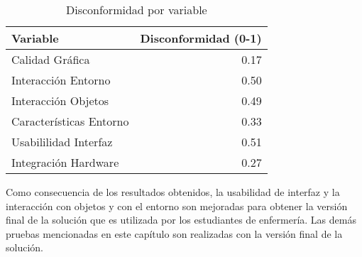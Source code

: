 
\begin{table}[H]
\centering
\begin{tabular}{lr}
\toprule
Variable & Disconformidad (0-1)\\
\midrule
Calidad Gráfica         & 0.17 \\
Interacción Entorno     & 0.50\\
Interacción Objetos     & 0.49\\
Características Entorno & 0.33\\
Usabililidad Interfaz   & 0.51\\
Integración Hardware    & 0.27\\
\bottomrule
\end{tabular}
\caption{Disconformidad por variable}
\label{tab:interfaz_disconformidad_metrica}
\end{table}


Como consecuencia de los resultados obtenidos, la usabilidad de interfaz y la interacción con objetos y 
con el entorno son mejoradas para obtener la versión final de la solución que es utilizada por 
los estudiantes de enfermería. Las demás pruebas mencionadas en este capítulo son realizadas con 
la versión final de la solución.

